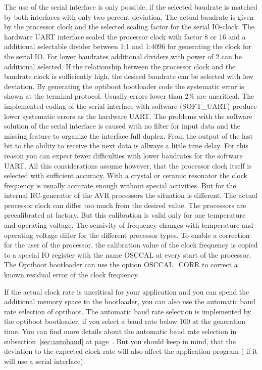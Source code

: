 The use of the serial interface is only possible, if the selected baudrate is
matched by both interfaces with only two percent deviation.
The actual baudrate is given by the processor clock and the selected scaling factor for
the serial IO-clock. 
The hardware UART interface scaled the processor clock with factor 8 or 16 and a
additional selectable divider between 1:1 and 1:4096 for generating the clock
for the serial IO.
For lower baudrates additional dividers with power of 2 can be additional selected.
If the relationship between the processor clock and the baudrate clock is
sufficiently high, the desired baudrate can be selected with low deviation.
By generating the optiboot bootloader code the systematic error is shown
at the terminal protocol.
Usually errors lower than 2\% are uncritical.
The implemented coding of the serial interface with software (SOFT\_UART) produce
lower systematic errors as the hardware UART.
The problems with the software solution of the serial interface is caused with
no filter for input data and the missing feature to organize the interface
full duplex. From the output of the last bit to the ability to receive
the next data is allways a little time delay.
For this reason you can expect fewer difficulties with lower baudrates for
the software UART.
All this considerations assume however, that the processor clock itself is
selected with sufficient accuracy.
With a crystal or ceramic resonator the clock frequency is usually accurate enough
without special activities. But for the internal RC-generator of the AVR processors
the situation is different.
The actual processor clock can differ too much from the desired value.
The processors are precalibrated at factory. But this calibration is
valid only for one temperature and operating voltage.
The sensivity of frequency changes with temperature and operating voltage
differ for the different processor types.
To enable a correction for the user of the processor, the calibration value
of the clock frequency is copied to a special IO register with the name OSCCAL
at every start of the processor.
The Optiboot bootloader can use the option OSCCAL\_CORR to correct a
known residual error of the clock frequency.

If the actual clock rate is uncritical for your application and you
can spend the additional memory space to the bootloader,
you can also use the automatic baud rate selection of optiboot.
The automatic baud rate selection is implemented by the optiboot bootloader,
if you select a baud rate below 100 at the generation time.
You can find more details about the automatic baud rate selection in
subsection~\ref{sec:autobaud} at page~\pageref{sec:autobaud}.
But you should keep in mind, that the deviation to the expected clock rate
will also affect the application program ( if it will use a serial interface).

